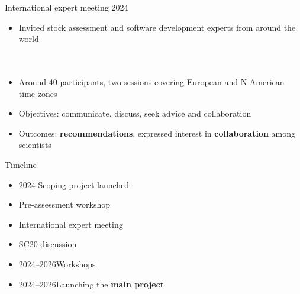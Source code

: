 \documentclass[aspectratio=169,fleqn]{beamer}
\begin{document}
\begin{frame}{International expert meeting 2024}
  \begin{itemize}
    \item[] Invited stock assessment and software development experts from
    around the world\\
    \\
    \\[4ex]
    \item[] Around 40 participants, two sessions covering European and N
    American time zones\\[4ex]
    \item[] Objectives: communicate, discuss, seek advice and
    collaboration\\[4ex]
    \item[] Outcomes: {\darkgreen\bf recommendations}, expressed interest in
    {\darkgreen\bf collaboration} among scientists\\[2ex]
  \end{itemize}
\end{frame}


\begin{frame}{Timeline}
  \begin{itemize}
    \item[] 2024 \quad Scoping project launched\\[1ex]
    \item[] \phantom{2024} \quad Pre-assessment workshop\\[1ex]
    \item[] \phantom{2024} \quad International expert meeting\\[1ex]
    \item[] \phantom{2024} \quad SC20 discussion\\[3ex]
    \item[] 2024--2026\quad Workshops\\[3ex]
    \item[] 2024--2026\quad Launching the {\darkgreen\bf main project}\\[3ex]
  \end{itemize}
\end{frame}

\end{document}
